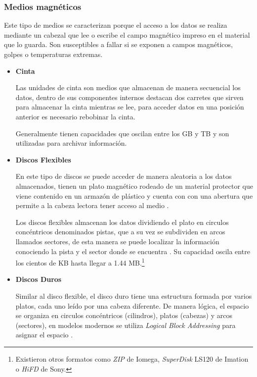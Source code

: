 \newpage
      \subsubsection*{Medios magn\'{e}ticos}

Este tipo de medios se caracterizan porque el acceso a los datos se realiza mediante un cabezal que lee o escribe el campo magn\'{e}tico impreso en el material que lo guarda. Son susceptibles a fallar si se exponen a campos magn\'{e}ticos, golpes o temperaturas extremas.

\begin{itemize}

  \item \textbf{Cinta}

Las unidades de cinta son medios que almacenan de manera secuencial los datos, dentro de sus componentes internos destacan dos carretes que sirven para almacenar la cinta mientras se lee, para acceder datos en una posici\'{o}n anterior es necesario rebobinar la cinta.

Generalmente tienen capacidades que oscilan entre los \textsc{GB} y \textsc{TB}  \cite{_powervault_????} y son utilizadas para archivar informaci\'{o}n.

  \item \textbf{Discos Flexibles}

En este tipo de discos se puede acceder de manera aleatoria a los datos almacenados, tienen un plato magn\'{e}tico rodeado de un material protector que viene contenido en un armaz\'{o}n de pl\'{a}stico y cuenta con con una abertura que permite a la cabeza lectora tener acceso al medio \cite{_anatomy_????}.

Los discos flexibles almacenan los datos dividiendo el plato en circulos conc\'{e}ntricos denominados pistas, que a su vez se subdividen en arcos llamados sectores, de esta manera se puede localizar la informaci\'{o}n conociendo la pista y el sector donde se encuentra \cite{_illustrated_????}. Su capacidad oscila entre los cientos de \textsc{KB} hasta llegar a 1.44 \textsc{MB}.\footnote{Existieron otros formatos como \textit{ZIP} de Iomega, \textit{SuperDisk} LS120 de Imation o \textit{HiFD} de Sony.}

  \item \textbf{Discos Duros}

Similar al disco flexible, el disco duro tiene una estructura formada por varios platos, cada uno le\'{i}do por una cabeza diferente. De manera l\'{o}gica, el espacio se organiza en circulos conc\'{e}ntricos (cilindros), platos (cabezas) y arcos (sectores), en modelos modernos se utiliza \emph{Logical Block Addressing} para asignar el espacio \cite{_introduction_????}.


\end{itemize}
